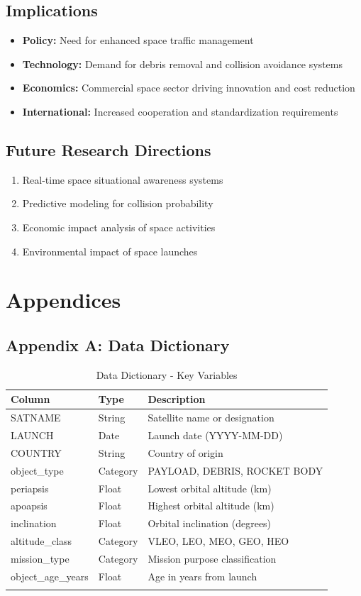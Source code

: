\documentclass[12pt,a4paper]{article}
\begin{document}
\subsection{Implications}
\begin{itemize}
    \item \textbf{Policy:} Need for enhanced space traffic management
    \item \textbf{Technology:} Demand for debris removal and collision avoidance systems
    \item \textbf{Economics:} Commercial space sector driving innovation and cost reduction
    \item \textbf{International:} Increased cooperation and standardization requirements
\end{itemize}

\subsection{Future Research Directions}
\begin{enumerate}
    \item Real-time space situational awareness systems
    \item Predictive modeling for collision probability
    \item Economic impact analysis of space activities
    \item Environmental impact of space launches
\end{enumerate}

\section{Appendices}

\subsection{Appendix A: Data Dictionary}
\begin{longtable}{@{}p{3cm}p{2cm}p{8cm}@{}}
\toprule
\textbf{Column} & \textbf{Type} & \textbf{Description} \\
\midrule
\endhead
SATNAME & String & Satellite name or designation \\
LAUNCH & Date & Launch date (YYYY-MM-DD) \\
COUNTRY & String & Country of origin \\
object\_type & Category & PAYLOAD, DEBRIS, ROCKET BODY \\
periapsis & Float & Lowest orbital altitude (km) \\
apoapsis & Float & Highest orbital altitude (km) \\
inclination & Float & Orbital inclination (degrees) \\
altitude\_class & Category & VLEO, LEO, MEO, GEO, HEO \\
mission\_type & Category & Mission purpose classification \\
object\_age\_years & Float & Age in years from launch \\
\bottomrule
\caption{Data Dictionary - Key Variables}
\end{longtable}
\end{document}
